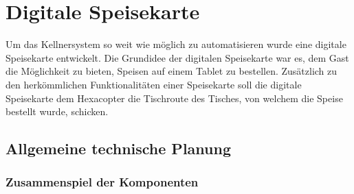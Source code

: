 \chapter{Digitale Speisekarte}
\renewcommand{\kapitelautor}{Autor: Katharina Joksch}
Um das Kellnersystem so weit wie möglich zu automatisieren wurde eine digitale Speisekarte entwickelt. 
Die Grundidee der digitalen Speisekarte war es, dem Gast die Möglichkeit zu bieten, Speisen auf einem Tablet zu bestellen.
Zusätzlich zu den herkömmlichen Funktionalitäten einer Speisekarte soll die digitale Speisekarte dem Hexacopter die Tischroute des Tisches, von welchem die Speise bestellt wurde, schicken. 

\section{Allgemeine technische Planung}

  \subsection{Zusammenspiel der Komponenten}

